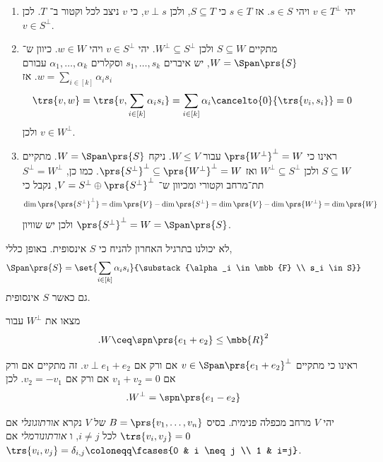 \documentclass[a4paper,10pt,twoside,openany]{book}
\begin{document}
\begin{solution}
\begin{enumerate}
\item
יהי
$v \in T^\perp$
ויהי
$s \in S$.
אז
$s \in T$
כי
$S \subseteq T$,
ולכן
$v \perp s$,
כי
$v$
ניצב לכל וקטור ב־%
$T$.
לכן
$v \in S^\perp$.

\item
מתקיים
$S \subseteq W$
ולכן
$W^\perp \subseteq S^\perp$.
יהי
$v \in S^\perp$
ויהי
$w \in W$.
כיוון ש־%
$W = \Span\prs{S}$,
יש איברים
$s_1, \ldots, s_k$
וסקלרים
$\alpha_1, \ldots, \alpha_k$
עבורם
$w = \sum_{i \in [k]} \alpha_i s_i$.
אז
\[\trs{v,w} = \trs{v, \sum_{i \in [k]} \alpha_i s_i} = \sum_{i \in [k]} \alpha_i \cancelto{0}{\trs{v_i, s_i}} = 0\]
ולכן
$v \in W^\perp$.

\item
ראינו כי
$\prs{W^\perp}^\perp = W$
עבור
$W \leq V$.
ניקח
$W = \Span\prs{S}$.
מתקיים
$S \subseteq W$
ולכן
$W^\perp \subseteq S^\perp$
ואז
$\prs{S^\perp}^\perp \subseteq \prs{W^\perp}^\perp = W$.
כמו כן,
$S^\perp = W^\perp$
תת־מרחב וקטורי ומכיוון ש־%
$V = S^\perp \oplus \prs{S^\perp}^\perp$,
נקבל כי
\[\dim\prs{\prs{S^\perp}^\perp} = \dim\prs{V} - \dim\prs{S^\perp} = \dim\prs{V} - \dim\prs{W^\perp} = \dim\prs{W}\]
ולכן יש שוויון
$\prs{S^\perp}^\perp = W = \Span\prs{S}$.
\end{enumerate}
\end{solution}

\begin{remark}
לא יכולנו בתרגיל האחרון להניח כי
$S$
אינסופית. באופן כללי,
\[\Span\prs{S} = \set{\sum_{i \in [k]} \alpha_i s_i}{\substack{\alpha_i \in \mbb{F} \\ s_i \in S}}\]
גם כאשר
$S$
אינסופית.
\end{remark}

\begin{exercisechap}
מצאו את
$W^\perp$
עבור
\[\text{.} W \ceq \spn\prs{e_1 + e_2} \leq \mbb{R}^2\]
\end{exercisechap}

\begin{solution}
ראינו כי מתקיים
$v \in \Span\prs{e_1 + e_2}^\perp$
אם ורק אם
$v \perp e_1 + e_2$.
זה מתקיים
אם ורק אם
$v_1 + v_2 = 0$
אם ורק אם
$v_2 = - v_1$.
לכן
\[\text{.} W^\perp = \spn\prs{e_1 - e_2}\]
\end{solution}

\begin{definition}
יהי
$V$
מרחב מכפלה פנימית.
בסיס
$B = \prs{v_1, \ldots, v_n}$
של
$V$
נקרא
\emph{אורתוגונלי}
אם
$\trs{v_i, v_j} = 0$
לכל
$i \neq j$,
ו%
\emph{אורתונורמלי}
אם
$\trs{v_i, v_j} = \delta_{i,j} \coloneqq \fcases{0 & i \neq j \\ 1 & i=j}$.
\end{definition}
\end{document}
